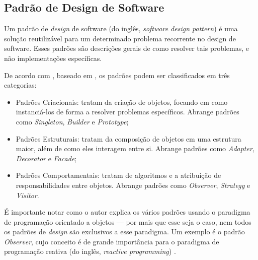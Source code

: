 \subsection{Padrão de Design de Software}

Um padrão de \textit{design} de software (do inglês, \textit{software design pattern}) é uma solução reutilizável para um determinado problema recorrente no design de software. Esses padrões são descrições gerais de como resolver tais problemas, e não implementações específicas.

De acordo com , baseado em , os padrões podem ser classificados em três categorias:

\begin{itemize}
	\item Padrões Criacionais: tratam da criação de objetos, focando em como instanciá-los de forma a resolver problemas específicos. Abrange padrões como \textit{Singleton}, \textit{Builder} e \textit{Prototype};
	\item Padrões Estruturais: tratam da composição de objetos em uma estrutura maior, além de como eles interagem entre si. Abrange padrões como \textit{Adapter}, \textit{Decorator} e \textit{Facade};
	\item Padrões Comportamentais: tratam de algoritmos e a atribuição de responsabilidades entre objetos. Abrange padrões como \textit{Observer}, \textit{Strategy} e \textit{Visitor}.
\end{itemize}

É importante notar como o autor explica os vários padrões usando o paradigma de programação orientado a objetos — por mais que esse seja o caso, nem todos os padrões de \textit{design} são exclusivos a esse paradigma. Um exemplo é o padrão \textit{Observer}, cujo conceito é de grande importância para o paradigma de programação reativa (do inglês, \textit{reactive programming}) \cite{reactivex}.
